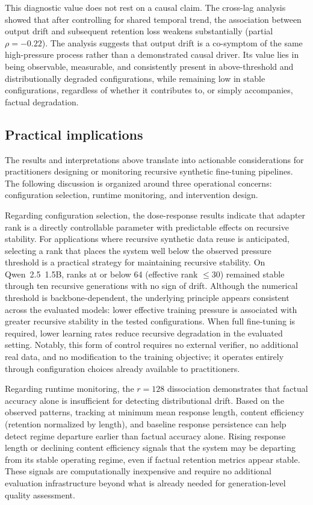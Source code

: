 \documentclass[a4paper,fleqn]{cas-dc}
\begin{document}
This diagnostic value does not rest on a causal claim. The
cross-lag analysis showed that after controlling for shared temporal trend, the
association between output drift and subsequent retention loss weakens
substantially (partial $\rho = -0.22$). The analysis suggests that output drift is a
co-symptom of the same high-pressure process rather than a demonstrated causal
driver. Its value lies in being observable, measurable, and consistently present
in above-threshold and distributionally degraded configurations, while remaining
low in stable configurations, regardless of whether it contributes to, or simply
accompanies, factual degradation.

\subsection{Practical implications}\label{sec:disc_practical}

The results and interpretations above translate into actionable considerations
for practitioners designing or monitoring recursive synthetic fine-tuning
pipelines. The following discussion is organized around three operational concerns: configuration
selection, runtime monitoring, and intervention design.

Regarding configuration selection, the dose-response results indicate that
adapter rank is a directly controllable parameter with predictable effects on
recursive stability. For applications where recursive synthetic data reuse is
anticipated, selecting a rank that places the system well below the observed
pressure threshold is a practical strategy for maintaining recursive stability.
On Qwen~2.5~1.5B, ranks at or below 64 (effective rank $\leq 30$) remained
stable through ten recursive generations with no sign of drift. Although
the numerical threshold is backbone-dependent, the underlying principle appears
consistent across the evaluated models: lower effective training pressure is
associated with greater recursive stability in the tested configurations. When
full fine-tuning is required, lower learning rates reduce recursive degradation
in the evaluated setting. Notably, this form of control requires no external
verifier, no additional real data, and no modification to the training objective;
it operates entirely through configuration choices already available to
practitioners.

Regarding runtime monitoring, the $r=128$ dissociation demonstrates that factual
accuracy alone is insufficient for detecting distributional drift. Based on the
observed patterns, tracking at minimum mean response length, content efficiency
(retention normalized by length), and baseline response persistence can help
detect regime departure earlier than factual accuracy alone. Rising response
length or declining content efficiency signals that the system may be departing
from its stable operating regime, even if factual retention metrics appear
stable. These signals are computationally inexpensive and require no additional
evaluation infrastructure beyond what is already needed for generation-level
quality assessment.
\end{document}
